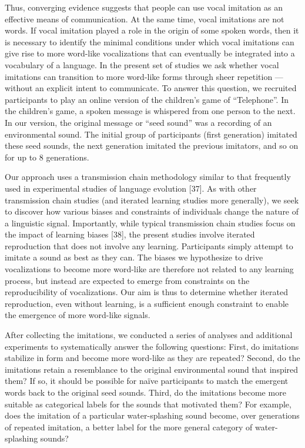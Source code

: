 \documentclass[english,floatsintext,man]{apa6}
\theoremstyle{definition}
\theoremstyle{definition}
\theoremstyle{definition}
\theoremstyle{remark}
\begin{document}
Thus, converging evidence suggests that people can use vocal imitation
as an effective means of communication. At the same time, vocal
imitations are not words. If vocal imitation played a role in the origin
of some spoken words, then it is necessary to identify the minimal
conditions under which vocal imitations can give rise to more word-like
vocalizations that can eventually be integrated into a vocabulary of a
language. In the present set of studies we ask whether vocal imitations
can transition to more word-like forms through sheer repetition ---
without an explicit intent to communicate. To answer this question, we
recruited participants to play an online version of the children's game
of \enquote{Telephone}. In the children's game, a spoken message is
whispered from one person to the next. In our version, the original
message or \enquote{seed sound} was a recording of an environmental
sound. The initial group of participants (first generation) imitated
these seed sounds, the next generation imitated the previous imitators,
and so on for up to 8 generations.

Our approach uses a transmission chain methodology similar to that
frequently used in experimental studies of language evolution {[}37{]}.
As with other transmission chain studies (and iterated learning studies
more generally), we seek to discover how various biases and constraints
of individuals change the nature of a linguistic signal. Importantly,
while typical transmission chain studies focus on the impact of learning
biases {[}38{]}, the present studies involve iterated reproduction that
does not involve any learning. Participants simply attempt to imitate a
sound as best as they can. The biases we hypothesize to drive
vocalizations to become more word-like are therefore not related to any
learning process, but instead are expected to emerge from constraints on
the reproducibility of vocalizations. Our aim is thus to determine
whether iterated reproduction, even without learning, is a sufficient
enough constraint to enable the emergence of more word-like signals.

After collecting the imitations, we conducted a series of analyses and
additional experiments to systematically answer the following questions:
First, do imitations stabilize in form and become more word-like as they
are repeated? Second, do the imitations retain a resemblance to the
original environmental sound that inspired them? If so, it should be
possible for naïve participants to match the emergent words back to the
original seed sounds. Third, do the imitations become more suitable as
categorical labels for the sounds that motivated them? For example, does
the imitation of a particular water-splashing sound become, over
generations of repeated imitation, a better label for the more general
category of water-splashing sounds?
\end{document}
